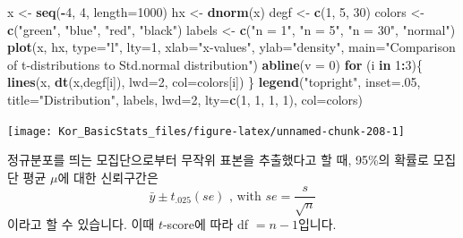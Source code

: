 \documentclass[]{book}
\newenvironment{Shaded}{\begin{snugshade}}{\end{snugshade}}
\newcommand{\ControlFlowTok}[1]{\textcolor[rgb]{0.13,0.29,0.53}{\textbf{#1}}}
\newcommand{\DataTypeTok}[1]{\textcolor[rgb]{0.13,0.29,0.53}{#1}}
\newcommand{\DecValTok}[1]{\textcolor[rgb]{0.00,0.00,0.81}{#1}}
\newcommand{\KeywordTok}[1]{\textcolor[rgb]{0.13,0.29,0.53}{\textbf{#1}}}
\newcommand{\NormalTok}[1]{#1}
\newcommand{\OperatorTok}[1]{\textcolor[rgb]{0.81,0.36,0.00}{\textbf{#1}}}
\newcommand{\StringTok}[1]{\textcolor[rgb]{0.31,0.60,0.02}{#1}}
\begin{document}
\begin{Shaded}
\begin{Highlighting}[]
\NormalTok{x <-}\StringTok{ }\KeywordTok{seq}\NormalTok{(}\OperatorTok{-}\DecValTok{4}\NormalTok{, }\DecValTok{4}\NormalTok{, }\DataTypeTok{length=}\DecValTok{1000}\NormalTok{)}
\NormalTok{hx <-}\StringTok{ }\KeywordTok{dnorm}\NormalTok{(x)}
\NormalTok{degf <-}\StringTok{ }\KeywordTok{c}\NormalTok{(}\DecValTok{1}\NormalTok{, }\DecValTok{5}\NormalTok{, }\DecValTok{30}\NormalTok{)}
\NormalTok{colors <-}\StringTok{ }\KeywordTok{c}\NormalTok{(}\StringTok{"green"}\NormalTok{, }\StringTok{"blue"}\NormalTok{, }\StringTok{"red"}\NormalTok{, }\StringTok{"black"}\NormalTok{)}
\NormalTok{labels <-}\StringTok{ }\KeywordTok{c}\NormalTok{(}\StringTok{"n = 1"}\NormalTok{, }\StringTok{"n = 5"}\NormalTok{, }\StringTok{"n = 30"}\NormalTok{, }\StringTok{"normal"}\NormalTok{)}
\KeywordTok{plot}\NormalTok{(x, hx, }\DataTypeTok{type=}\StringTok{"l"}\NormalTok{, }\DataTypeTok{lty=}\DecValTok{1}\NormalTok{, }
     \DataTypeTok{xlab=}\StringTok{"x-values"}\NormalTok{,}
     \DataTypeTok{ylab=}\StringTok{"density"}\NormalTok{, }\DataTypeTok{main=}\StringTok{"Comparison of t-distributions to Std.normal distribution"}\NormalTok{)}
\KeywordTok{abline}\NormalTok{(}\DataTypeTok{v =} \DecValTok{0}\NormalTok{)}
\ControlFlowTok{for}\NormalTok{ (i }\ControlFlowTok{in} \DecValTok{1}\OperatorTok{:}\DecValTok{3}\NormalTok{)\{}
  \KeywordTok{lines}\NormalTok{(x, }\KeywordTok{dt}\NormalTok{(x,degf[i]), }\DataTypeTok{lwd=}\DecValTok{2}\NormalTok{, }\DataTypeTok{col=}\NormalTok{colors[i])}
\NormalTok{  \}}
\KeywordTok{legend}\NormalTok{(}\StringTok{"topright"}\NormalTok{, }\DataTypeTok{inset=}\NormalTok{.}\DecValTok{05}\NormalTok{, }\DataTypeTok{title=}\StringTok{"Distribution"}\NormalTok{,}
\NormalTok{       labels, }\DataTypeTok{lwd=}\DecValTok{2}\NormalTok{, }\DataTypeTok{lty=}\KeywordTok{c}\NormalTok{(}\DecValTok{1}\NormalTok{, }\DecValTok{1}\NormalTok{, }\DecValTok{1}\NormalTok{, }\DecValTok{1}\NormalTok{), }\DataTypeTok{col=}\NormalTok{colors)}
\end{Highlighting}
\end{Shaded}

\begin{center}\texttt{[image: Kor\_BasicStats\_files/figure-latex/unnamed-chunk-208-1]} \end{center}

정규분포를 띄는 모집단으로부터 무작위 표본을 추출했다고 할 때, 95\%의 확률로 모집단 평균 \(\mu\)에 대한 신뢰구간은 \[\bar{y} \pm t_{.025}(se) \text{ , with }se = \frac{s}{\sqrt{n}}\]이라고 할 수 있습니다. 이때 \(t\)-score에 따라 df \(= n-1\)입니다.
\end{document}
